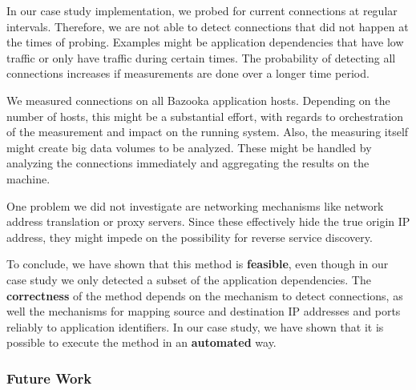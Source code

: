 In our case study implementation, we probed for current connections at regular intervals. Therefore, we are not able to detect connections that did not happen at the times of probing. Examples might be application dependencies that have low traffic or only have traffic during certain times. The probability of detecting all connections increases if measurements are done over a longer time period.


We measured connections on all Bazooka application hosts. Depending on the number of hosts, this might be a substantial effort, with regards to orchestration of the measurement and impact on the running system. Also, the measuring itself might create big data volumes to be analyzed. These might be handled by analyzing the connections immediately and aggregating the results on the machine.

One problem we did not investigate are networking mechanisms like network address translation or proxy servers. Since these effectively hide the true origin IP address, they might impede on the possibility for reverse service discovery.

To conclude, we have shown that this method is \textbf{feasible}, even though in our case study we only detected a subset of the application dependencies. The  \textbf{correctness} of the method depends on the mechanism to detect connections, as well the mechanisms for mapping source and destination IP addresses and ports reliably to application identifiers. In our case study, we have shown that it is possible to execute the method in an \textbf{automated} way.

\subsubsection{Future Work}

%
%

